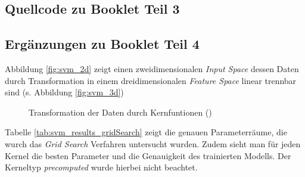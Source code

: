 \subsection{Quellcode zu Booklet Teil 3}


\subsection{Ergänzungen zu Booklet Teil 4}\label{app:svm_ergaenzungen}
Abbildung \ref{fig:svm_2d} zeigt einen zweidimensionalen \emph{Input Space} dessen Daten durch Transformation in einem dreidimensionalen \emph{Feature Space} linear trennbar sind (s. Abbildung \ref{fig:svm_3d})\\
\begin{figure}[h]
	\centering
	\hfill
	\caption{Transformation der Daten durch Kernfuntionen (\cite{2018_mello_ponti})}
\end{figure}
Tabelle \ref{tab:svm_results_gridSearch} zeigt die genauen Parameterräume, die wurch das \emph{Grid Search} Verfahren untersucht wurden. Zudem sieht man für jeden Kernel die besten Parameter und die Genauigkeit des trainierten Modells. Der Kerneltyp \emph{precomputed} wurde hierbei nicht beachtet.
